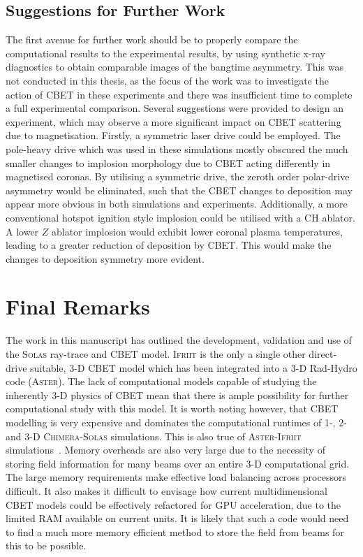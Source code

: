 \subsection{Suggestions for Further Work}

The first avenue for further work should be to properly compare the computational results to the experimental results, by using synthetic x-ray diagnostics to obtain comparable images of the bangtime asymmetry.
This was not conducted in this thesis, as the focus of the work was to investigate the action of \ac{CBET} in these experiments and there was insufficient time to complete a full experimental comparison.
Several suggestions were provided to design an experiment, which may observe a more significant impact on \ac{CBET} scattering due to magnetisation.
Firstly, a symmetric laser drive could be employed.
The pole-heavy drive which was used in these simulations mostly obscured the much smaller changes to implosion morphology due to \ac{CBET} acting differently in magnetised coronas.
By utilising a symmetric drive, the zeroth order polar-drive asymmetry would be eliminated, such that the \ac{CBET} changes to deposition may appear more obvious in both simulations and experiments.
Additionally, a more conventional hotspot ignition style implosion could be utilised with a CH ablator.
A lower $Z$ ablator implosion would exhibit lower coronal plasma temperatures, leading to a greater reduction of deposition by \ac{CBET}.
This would make the changes to deposition symmetry more evident.

\section{Final Remarks}

The work in this manuscript has outlined the development, validation and use of the \textsc{Solas} ray-trace and \ac{CBET} model.
\textsc{Ifriit} is the only a single other direct-drive suitable, 3-D \ac{CBET} model which has been integrated into a 3-D \ac{Rad-Hydro} code (\textsc{Aster}).
The lack of computational models capable of studying the inherently 3-D physics of \ac{CBET} mean that there is ample possibility for further computational study with this model.
It is worth noting however, that \ac{CBET} modelling is very expensive and dominates the computational runtimes of 1-, 2- and 3-D \textsc{Chimera}-\textsc{Solas} simulations.
This is also true of \textsc{Aster}-\textsc{Ifriit} simulations~\cite{colaitis_inverse_2021}.
Memory overheads are also very large due to the necessity of storing field information for many beams over an entire 3-D computational grid.
The large memory requirements make effective load balancing across processors difficult.
It also makes it difficult to envisage how current multidimensional \ac{CBET} models could be effectively refactored for \ac{GPU} acceleration, due to the limited \ac{RAM} available on current units.
It is likely that such a code would need to find a much more memory efficient method to store the field from beams for this to be possible.


